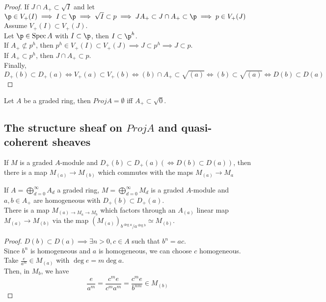 \documentclass[../main.tex]{subfiles}
\begin{document}
\begin{proof}
If $J \cap A_+ \subset \sqrt{I} $ and let $\p \in V_+( I) \implies I \subset \p \implies \sqrt{I} \subset p\implies J A_+ \subset   J\cap A_+ \subset \p \implies p \in V_+( J) $ \\
Assume $V_+( I) \subset V_+( J) $.\\
Let $\p \in \spec A$ with $I \subset \p$, then $I \subset \p^{h}$.\\
If $A_+ \not \subset p^{h}$, then $p^{h}\in V_+( I) \subset V_+( J) \implies J \subset p^{h}\implies J \subset p$.\\
If $A_+ \subset p^{h}$, then $ J \cap A_+ \subset p$.\\
Finally, $D_+( b) \subset D_+( a) \iff V_+( a) \subset V_+( b) \iff ( b) \cap A_+ \subset \sqrt{( a) } \iff ( b) \subset \sqrt{( a) } \iff D( b) \subset D( a) $ 
\end{proof}
\begin{crly}
Let $A$ be a graded ring, then $Proj A = \emptyset $ iff $A_+ \subset \sqrt{0} $.
\end{crly}
\subsection{The structure sheaf on $Proj A$ and quasi-coherent sheaves}
If $M$ is a graded $A$-module and $D_+( b) \subset D_+( a) ( \iff D( b) \subset D( a) ) $, then there is a map $M_{( a) } \to M_{( b) } $ which commutes with the maps $M_{( a) } \to M_a$ 
\begin{lemma}
If $A= \bigoplus_{d=0}^{ \infty } A_d$  a graded ring, $M= \bigoplus_{d=0}^{ \infty }M_d$ is a graded $A$-module and $a,b \in A_+$ are homogeneous with $D_+( b) \subset D_+( a) $.\\
There is a map $M_{( a) \to M_a\to M_b} $ which factors through an $A_{( a) } $ linear map $M_{( a) } \to M_{( b) } $ via the map $( M_{( a) } )_{b^{\deg a}/a^{\deg b}} \simeq M_{( b) } $.
\end{lemma}
\begin{proof}
$D( b) \subset D( a) \implies \exists n>0,  c \in A$ such that $b^{n}= ac$.\\
Since $b^{n}$ is homogeneous and $a$ is homogeneous, we can choose $c$ homogeneous.\\
Take $\frac{e}{a^{m}}\in M_{( a) } $ with $\deg e = m \deg a$.\\
Then, in $M_b$, we have
\[ 
\frac{e}{a^{m}}= \frac{c^{m}e}{c^{m}a^{m}}= \frac{c^{m}e}{b^{nm}}\in M_{( b) } 
\]
\end{proof}
\end{document}
